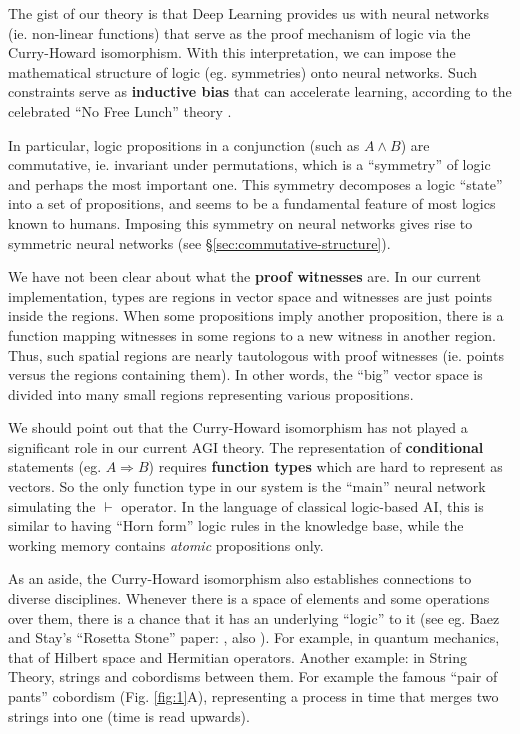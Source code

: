 \documentclass[orivec]{llncs}
\begin{document}
The gist of our theory is that Deep Learning provides us with neural networks (ie. non-linear functions) that serve as the proof mechanism of logic via the Curry-Howard isomorphism.  With this interpretation, we can impose the mathematical structure of logic (eg. symmetries) onto neural networks.  Such constraints serve as \textbf{inductive bias} that can accelerate learning, according to the celebrated ``No Free Lunch'' theory \cite{Wolpert1997} \cite{Alpaydin2020} \cite{Shalev-Shwartz2014}.

In particular, logic propositions in a conjunction (such as $A \wedge B$) are commutative, ie. invariant under permutations, which is a ``symmetry'' of logic and perhaps the most important one.  This symmetry decomposes a logic ``state'' into a set of propositions, and seems to be a fundamental feature of most logics known to humans.  Imposing this symmetry on neural networks gives rise to symmetric neural networks (see \S\ref{sec:commutative-structure}).

We have not been clear about what the \textbf{proof witnesses} are.  In our current implementation, types are regions in vector space and witnesses are just points inside the regions.  When some propositions imply another proposition, there is a function mapping witnesses in some regions to a new witness in another region.  Thus, such spatial regions are nearly tautologous with proof witnesses (ie. points versus the regions containing them).  In other words, the ``big'' vector space is divided into many small regions representing various propositions.

We should point out that the Curry-Howard isomorphism has not played a significant role in our current AGI theory.  The representation of \textbf{conditional} statements (eg. $A \Rightarrow B$) requires \textbf{function types} which are hard to represent as vectors.  So the only function type in our system is the ``main'' neural network simulating the $\vdash$ operator.  In the language of classical logic-based AI, this is similar to having  ``Horn form'' logic rules in the knowledge base, while the working memory contains \textit{atomic} propositions only.

As an aside, the Curry-Howard isomorphism also establishes connections to diverse disciplines.  Whenever there is a space of elements and some operations over them, there is a chance that it has an underlying ``logic'' to it (see eg. Baez and Stay's ``Rosetta Stone'' paper: \cite{Baez2010}, also \cite{Heunen2019}).  For example, in quantum mechanics, that of Hilbert space and Hermitian operators.  Another example: in String Theory, strings and cobordisms between them.  For example the famous ``pair of pants'' cobordism (Fig. \ref{fig:1}A), representing a process in time that merges two strings into one (time is read upwards).
\end{document}
